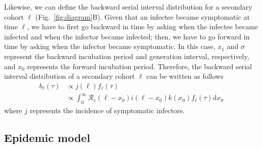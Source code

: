 \documentclass[12pt]{article}
\newcommand{\fref}[1]{Fig.~\ref{fig:#1}}
\begin{document}
Likewise, we can define the backward serial interval distribution for a secondary cohort $\ell$ (\fref{diagram}B).
Given that an infectee became symptomatic at time $\ell$, we have to first go backward in time by asking when the infectee became infected and when the infector became infected; 
then, we have to go forward in time by asking when the infector became symptomatic.
In this case, $x_1$ and $\sigma$ represent the backward incubation period and generation interval, respectively, and $x_0$ represents the forward incubation period.
Therefore, the backward serial interval distribution of a secondary cohort $\ell$ can be written as follows
\begin{equation}
\begin{aligned}
b_\ell(\tau) &\propto j(\ell) f_{\ell}(\tau)\\
&\propto \int_0^\infty \mathcal R_c (\ell - x_0) i(\ell-x_0) k(x_0) f_{\ell}(\tau) \mathrm{d} x_0
\end{aligned}
\end{equation}
where $j$ represents the incidence of symptomatic infectors.

\subsection{Epidemic model}
\end{document}

